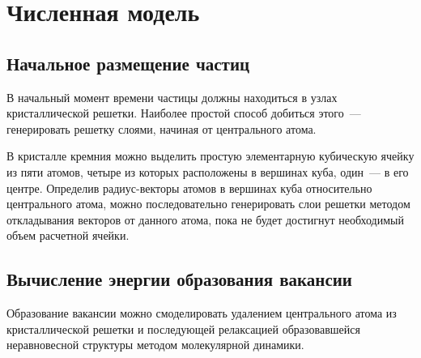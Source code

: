 \documentclass[12pt,a4paper]{article}
\begin{document}

    \section{Численная модель}


        \subsection{Начальное размещение частиц}

            В начальный момент времени частицы должны находиться в узлах кристаллической решетки. Наиболее простой способ добиться этого~--- генерировать решетку слоями, начиная от центрального атома.

            В кристалле кремния можно выделить простую элементарную кубическую ячейку из пяти атомов, четыре из которых расположены в вершинах куба, один~--- в его центре. Определив радиус-векторы атомов в вершинах куба относительно центрального атома, можно последовательно генерировать слои решетки методом откладывания векторов от данного атома, пока не будет достигнут необходимый объем расчетной ячейки.


        \subsection{Вычисление энергии образования вакансии}

            Образование вакансии можно смоделировать удалением центрального атома из кристаллической решетки и последующей релаксацией образовавшейся неравновесной структуры методом молекулярной динамики.
\end{document}
